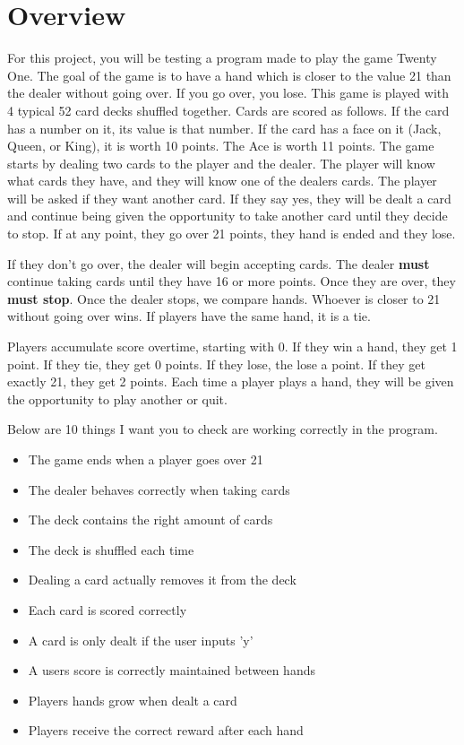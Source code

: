 \documentclass{article}
\begin{document}
\pagestyle{fancy}

\section*{Overview}
For this project, you will be testing a program made to play the game Twenty One.
The goal of the game is to have a hand which is closer to the value 21 than the dealer
without going over. If you go over, you lose. This game is played with 4 typical
52 card decks shuffled together. Cards are scored as follows. If the card has a number
on it, its value is that number. If the card has a face on it (Jack, Queen, or King), it
is worth 10 points. The Ace is worth 11 points. The game starts by dealing two cards to 
the player and the dealer. The player will know what cards they have, and they will know
one of the dealers cards. The player will be asked if they want another card. If they say yes,
they will be dealt a card and continue being given the opportunity to take another card until
they decide to stop. If at any point, they go over 21 points, they hand is ended and they lose.

If they don't go over, the dealer will begin accepting cards. The dealer \textbf{must} continue
taking cards until they have 16 or more points. Once they are over, they \textbf{must stop}. 
Once the dealer stops, we compare hands. Whoever is closer to 21 without going over wins. If
players have the same hand, it is a tie.

Players accumulate score overtime, starting with 0. If they win a hand, they get 1 point. 
If they tie, they get 0 points. If they lose, the lose a point. If they get exactly 21, they
get 2 points. Each time a player plays a hand, they will be given the opportunity to play another
or quit. 

Below are 10 things I want you to check are working correctly in the program.
\begin{itemize}
    \item The game ends when a player goes over 21
    \item The dealer behaves correctly when taking cards
    \item The deck contains the right amount of cards
    \item The deck is shuffled each time
    \item Dealing a card actually removes it from the deck
    \item Each card is scored correctly
    \item A card is only dealt if the user inputs 'y'
    \item A users score is correctly maintained between hands
    \item Players hands grow when dealt a card
    \item Players receive the correct reward after each hand
\end{itemize}
\end{document}
